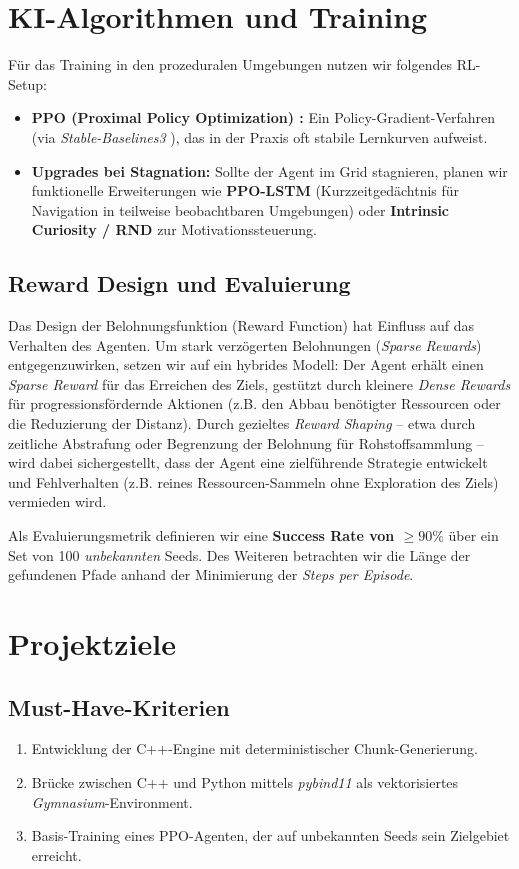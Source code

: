 \documentclass[12pt,a4paper]{article}
\begin{document}
\section{KI-Algorithmen und Training}
F\"ur das Training in den prozeduralen Umgebungen nutzen wir folgendes RL-Setup:

\begin{itemize}
    \item \textbf{PPO (Proximal Policy Optimization) \cite{schulman2017ppo}:} Ein Policy-Gradient-Verfahren (via \textit{Stable-Baselines3} \cite{raffin2021stable}), das in der Praxis oft stabile Lernkurven aufweist.
    \item \textbf{Upgrades bei Stagnation:} Sollte der Agent im Grid stagnieren, planen wir funktionelle Erweiterungen wie \textbf{PPO-LSTM} (Kurzzeitged\"achtnis f\"ur Navigation in teilweise beobachtbaren Umgebungen) oder \textbf{Intrinsic Curiosity / RND} \cite{pathak2017icm, burda2018rnd} zur Motivationssteuerung.
\end{itemize}

\subsection{Reward Design und Evaluierung}
Das Design der Belohnungsfunktion (Reward Function) hat Einfluss auf das Verhalten des Agenten. Um stark verz\"ogerten Belohnungen (\textit{Sparse Rewards}) entgegenzuwirken, setzen wir auf ein hybrides Modell: Der Agent erh\"alt einen \textit{Sparse Reward} f\"ur das Erreichen des Ziels, gest\"utzt durch kleinere \textit{Dense Rewards} f\"ur progressionsf\"ordernde Aktionen (z.B. den Abbau ben\"otigter Ressourcen oder die Reduzierung der Distanz). Durch gezieltes \textit{Reward Shaping} – etwa durch zeitliche Abstrafung oder Begrenzung der Belohnung f\"ur Rohstoffsammlung – wird dabei sichergestellt, dass der Agent eine zielf\"uhrende Strategie entwickelt und Fehlverhalten (z.B. reines Ressourcen-Sammeln ohne Exploration des Ziels) vermieden wird.

Als Evaluierungsmetrik definieren wir eine \textbf{Success Rate von $\ge 90\%$} \"uber ein Set von 100 \textit{unbekannten} Seeds. Des Weiteren betrachten wir die L\"ange der gefundenen Pfade anhand der Minimierung der \textit{Steps per Episode}.

\section{Projektziele}
\subsection{Must-Have-Kriterien}
\begin{enumerate}
    \item Entwicklung der C++-Engine mit deterministischer Chunk-Generierung.
    \item Br\"ucke zwischen C++ und Python mittels \textit{pybind11} als vektorisiertes \textit{Gymnasium}-Environment.
    \item Basis-Training eines PPO-Agenten, der auf unbekannten Seeds sein Zielgebiet erreicht.
\end{enumerate}
\end{document}
